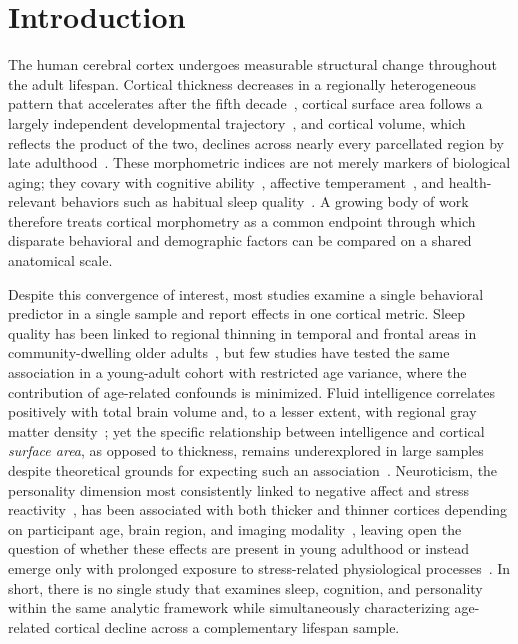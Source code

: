 
\section{Introduction}
\label{sec:introduction}

The human cerebral cortex undergoes measurable structural change throughout the adult lifespan. Cortical thickness decreases in a regionally heterogeneous pattern that accelerates after the fifth decade~\cite{fjell2010structural, salat2004thinning}, cortical surface area follows a largely independent developmental trajectory~\cite{storsve2014differential}, and cortical volume, which reflects the product of the two, declines across nearly every parcellated region by late adulthood~\cite{raz2005regional}. These morphometric indices are not merely markers of biological aging; they covary with cognitive ability~\cite{deary2010neuroscience}, affective temperament~\cite{riccelli2017surface}, and health-relevant behaviors such as habitual sleep quality~\cite{sexton2014poor}. A growing body of work therefore treats cortical morphometry as a common endpoint through which disparate behavioral and demographic factors can be compared on a shared anatomical scale.

Despite this convergence of interest, most studies examine a single behavioral predictor in a single sample and report effects in one cortical metric. Sleep quality has been linked to regional thinning in temporal and frontal areas in community-dwelling older adults~\cite{sexton2014poor, branger2016relationships}, but few studies have tested the same association in a young-adult cohort with restricted age variance, where the contribution of age-related confounds is minimized. Fluid intelligence correlates positively with total brain volume and, to a lesser extent, with regional gray matter density~\cite{pietschnig2015meta, colom2009human}; yet the specific relationship between intelligence and cortical \textit{surface area}, as opposed to thickness, remains underexplored in large samples despite theoretical grounds for expecting such an association~\cite{jung2007pfit}. Neuroticism, the personality dimension most consistently linked to negative affect and stress reactivity~\cite{costa1992neo}, has been associated with both thicker and thinner cortices depending on participant age, brain region, and imaging modality~\cite{bjornebekk2013neuronal, jackson2011cortical}, leaving open the question of whether these effects are present in young adulthood or instead emerge only with prolonged exposure to stress-related physiological processes~\cite{lupien2009effects}. In short, there is no single study that examines sleep, cognition, and personality within the same analytic framework while simultaneously characterizing age-related cortical decline across a complementary lifespan sample.

